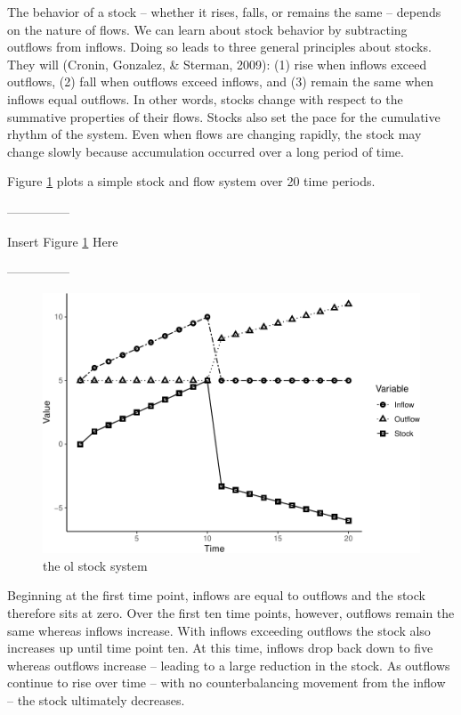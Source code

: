 \documentclass[english,,man]{apa6}
\theoremstyle{definition}
\theoremstyle{definition}
\theoremstyle{definition}
\theoremstyle{remark}
\begin{document}
The behavior of a stock -- whether it rises, falls, or remains the same
-- depends on the nature of flows. We can learn about stock behavior by
subtracting outflows from inflows. Doing so leads to three general
principles about stocks. They will (Cronin, Gonzalez, \& Sterman, 2009):
(1) rise when inflows exceed outflows, (2) fall when outflows exceed
inflows, and (3) remain the same when inflows equal outflows. In other
words, stocks change with respect to the summative properties of their
flows. Stocks also set the pace for the cumulative rhythm of the system.
Even when flows are changing rapidly, the stock may change slowly
because accumulation occurred over a long period of time.

Figure \ref{stocks} plots a simple stock and flow system over 20 time
periods.

\begin{center}

---------------

Insert Figure \ref{stocks} Here

---------------

\end{center}

\begin{figure}
\centering
\includegraphics{figs/unnamed-chunk-6-1.pdf}
\caption{\label{fig:unnamed-chunk-6}the ol stock system\label{stocks}}
\end{figure}

\noindent Beginning at the first time point, inflows are equal to
outflows and the stock therefore sits at zero. Over the first ten time
points, however, outflows remain the same whereas inflows increase. With
inflows exceeding outflows the stock also increases up until time point
ten. At this time, inflows drop back down to five whereas outflows
increase -- leading to a large reduction in the stock. As outflows
continue to rise over time -- with no counterbalancing movement from the
inflow -- the stock ultimately decreases.
\end{document}
